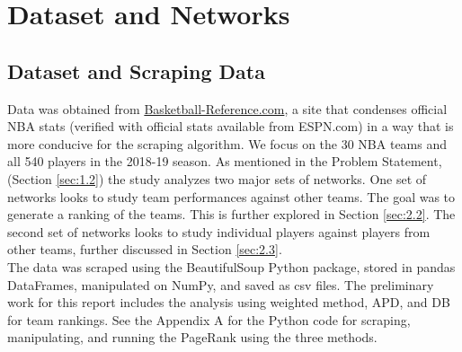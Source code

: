 \documentclass[12pt]{article}%
\begin{document}
\section{Dataset and Networks}
\label{sec:2}
\subsection{Dataset and Scraping Data}
\null\quad\quad Data was obtained from \href{https://www.basketball-reference.com/}{Basketball-Reference.com}, a site that condenses official NBA stats (verified with official stats available from ESPN.com) in a way that is more conducive for the scraping algorithm. We focus on the 30 NBA teams and all 540 players in the 2018-19 season. As mentioned in the Problem Statement, (Section \ref{sec:1.2}) the study analyzes two major sets of networks. One set of networks looks to study team performances against other teams. The goal was to generate a ranking of the teams. This is further explored in Section \ref{sec:2.2}. The second set of networks looks to study individual players against players from other teams, further discussed in Section \ref{sec:2.3}. \\
\null\quad\quad The data was scraped using the BeautifulSoup Python package, stored in pandas DataFrames, manipulated on NumPy, and saved as csv files. The preliminary work for this report includes the analysis using weighted method, APD, and DB for team rankings. See the Appendix A for the Python code for scraping, manipulating, and running the PageRank using the three methods.
\end{document}
